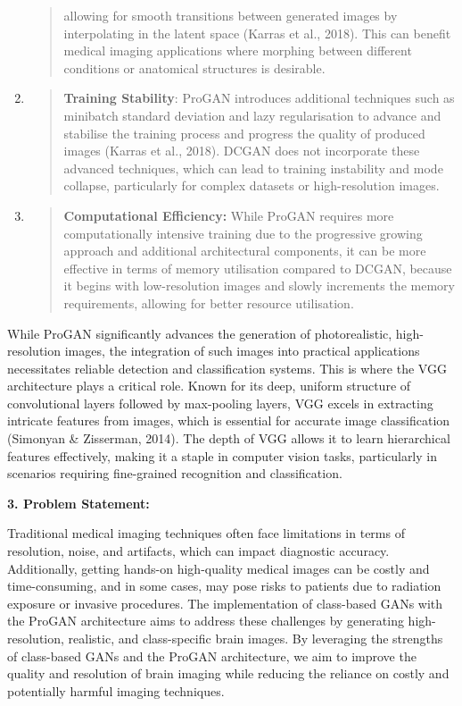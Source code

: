 \documentclass[
]{article}
\begin{document}
\begin{enumerate}
\begin{quote}
  allowing for smooth transitions between generated images by
  interpolating in the latent space (Karras et al., 2018). This can
  benefit medical imaging applications where morphing between different
  conditions or anatomical structures is desirable.
  \end{quote}
\item
  \begin{quote}
  \textbf{Training Stability}: ProGAN introduces additional techniques
  such as minibatch standard deviation and lazy regularisation to
  advance and stabilise the training process and progress the quality of
  produced images (Karras et al., 2018). DCGAN does not incorporate
  these advanced techniques, which can lead to training instability and
  mode collapse, particularly for complex datasets or high-resolution
  images.
  \end{quote}
\item
  \begin{quote}
  \textbf{Computational Efficiency:} While ProGAN requires more
  computationally intensive training due to the progressive growing
  approach and additional architectural components, it can be more
  effective in terms of memory utilisation compared to DCGAN, because it
  begins with low-resolution images and slowly increments the memory
  requirements, allowing for better resource utilisation.
  \end{quote}
\end{enumerate}

While ProGAN significantly advances the generation of photorealistic,
high-resolution images, the integration of such images into practical
applications necessitates reliable detection and classification systems.
This is where the VGG architecture plays a critical role. Known for its
deep, uniform structure of convolutional layers followed by max-pooling
layers, VGG excels in extracting intricate features from images, which
is essential for accurate image classification (Simonyan \& Zisserman,
2014). The depth of VGG allows it to learn hierarchical features
effectively, making it a staple in computer vision tasks, particularly
in scenarios requiring fine-grained recognition and classification.

\textbf{3. Problem Statement:}

Traditional medical imaging techniques often face limitations in terms
of resolution, noise, and artifacts, which can impact diagnostic
accuracy. Additionally, getting hands-on high-quality medical images can
be costly and time-consuming, and in some cases, may pose risks to
patients due to radiation exposure or invasive procedures. The
implementation of class-based GANs with the ProGAN architecture aims to
address these challenges by generating high-resolution, realistic, and
class-specific brain images. By leveraging the strengths of class-based
GANs and the ProGAN architecture, we aim to improve the quality and
resolution of brain imaging while reducing the reliance on costly and
potentially harmful imaging techniques.
\end{document}
